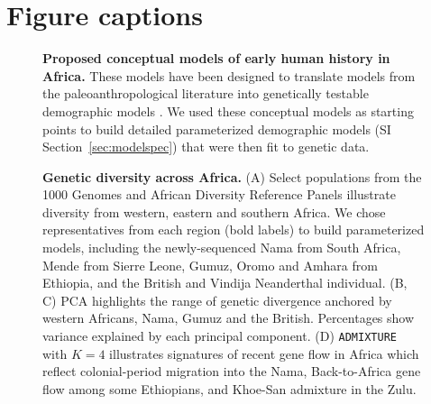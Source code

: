 \documentclass[]{article}
\begin{document}
\break

\section*{Figure captions}

\begin{figure}[ht]
    \centering
    \caption{
        \textbf{Proposed conceptual models of early human history in Africa.}
        These models have been designed to translate models from the 
        paleoanthropological literature into genetically testable demographic
        models \citep{Henn2018-rf}.
        We used these conceptual models as starting points to build detailed
        parameterized demographic models (SI Section~\ref{sec:modelspec})
        that were then fit to genetic data. 
    }
    \label{fig:proposed-models}
\end{figure}

\begin{figure}[ht!]
    \centering
    \caption[width=\textwidth]{
        \textbf{Genetic diversity across Africa.}
        (A) Select populations from the 1000 Genomes and African Diversity Reference Panels
        illustrate diversity from western, eastern and southern Africa.
        We chose representatives from each region (bold labels)
        to build parameterized models,
        including the newly-sequenced Nama from South Africa, Mende
        from Sierre Leone, Gumuz, Oromo and Amhara from Ethiopia, and the
        British and Vindija Neanderthal individual.
        (B, C) PCA highlights the range of genetic divergence anchored 
        by western Africans, Nama, Gumuz and the British.
        Percentages show variance explained by each principal component.
        (D) \texttt{ADMIXTURE} with $K=4$ illustrates signatures of recent gene flow in Africa
        which reflect colonial-period migration into the Nama,
        Back-to-Africa gene flow among some Ethiopians, and Khoe-San admixture in the Zulu.
    }
    \label{fig:diversity}
\end{figure}
 
\end{document}
